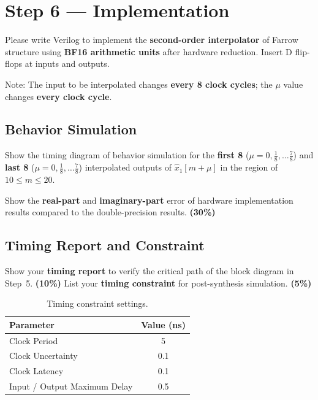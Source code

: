 \documentclass[12pt,a4paper]{report}
\begin{document}
\newpage

\chapter{Step 6 — Implementation}

Please write Verilog to implement the \textbf{second-order interpolator} of
Farrow structure using \textbf{BF16 arithmetic units} after hardware reduction.
Insert D flip-flops at inputs and outputs.

Note: The input to be interpolated changes \textbf{every 8 clock cycles};
the $\mu$ value changes \textbf{every clock cycle}.

\section{Behavior Simulation}

Show the timing diagram of behavior simulation for the
\textbf{first 8} ($\mu = 0,\tfrac{1}{8},\ldots\tfrac{7}{8}$) and
\textbf{last 8} ($\mu = 0,\tfrac{1}{8},\ldots\tfrac{7}{8}$)
interpolated outputs of $\hat{x}_1[m+\mu]$
in the region of $10 \le m \le 20$.

Show the \textbf{real-part} and \textbf{imaginary-part} error of hardware
implementation results compared to the double-precision results.
\textbf{(30\%)}

\newpage

\section{Timing Report and Constraint}

Show your \textbf{timing report} to verify the critical path of the block diagram
in Step~5. \textbf{(10\%)}
List your \textbf{timing constraint} for post-synthesis simulation. \textbf{(5\%)}


\begin{table}[H]
    \centering
    \begin{tabular}{lc}
        \toprule
        \textbf{Parameter} & \textbf{Value (ns)} \\
        \midrule
        Clock Period                  & 5\\
        Clock Uncertainty             & 0.1\\
        Clock Latency                 & 0.1\\
        Input / Output Maximum Delay  & 0.5\\
        \bottomrule
    \end{tabular}
    \caption{Timing constraint settings.}
    \label{tab:timing-constraint}
\end{table}
\end{document}
